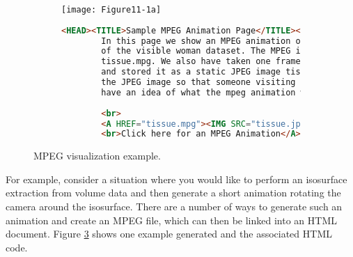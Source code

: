 \begin{figure}[htb]
    \centering
	\begin{subfigure}[h]{0.76\linewidth}
		\texttt{[image: Figure11-1a]}
		\captionsetup{justification=centering}
		\caption*{}
		\label{fig:Figure11-1a}
	\end{subfigure}
	\hfill
	\begin{subfigure}[h]{0.98\linewidth}
       \begin{lstlisting}[language=HTML,  caption={}, numbers=none, frame=none]
        <HEAD><TITLE>Sample MPEG Animation Page</TITLE></HEAD>
        In this page we show an MPEG animation of a visualization
        of the visible woman dataset. The MPEG is stored in a file
        tissue.mpg. We also have taken one frame from the animation
        and stored it as a static JPEG image tissue.jpg. We display
        the JPEG image so that someone visiting the site will
        have an idea of what the mpeg animation will contain.
        
        <br>
        <A HREF="tissue.mpg"><IMG SRC="tissue.jpg">
        <br>Click here for an MPEG Animation</A>
        \end{lstlisting}
        \label{fig:Figure11-1b}
	\end{subfigure}
	\caption{MPEG visualization example.}\label{fig:Figure11-1}
\end{figure}

For example, consider a situation where you would like to perform an isosurface extraction from volume data and then generate a short animation rotating the camera around the isosurface. There are a number of ways to generate such an animation and create an MPEG file, which can then be linked into an HTML document. Figure \ref{fig:Figure11-1} shows one example generated and the associated HTML code.

